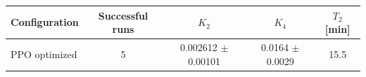 \begin{tabular}{lcccc}
\toprule
Configuration & Successful runs & $K_2$ & $K_4$ & $T_2$ [min] \\
\midrule
PPO optimized & 5 & 0.002612 $\pm$ 0.00101 & 0.0164 $\pm$ 0.0029 & 15.5 \\
\bottomrule
\end{tabular}
